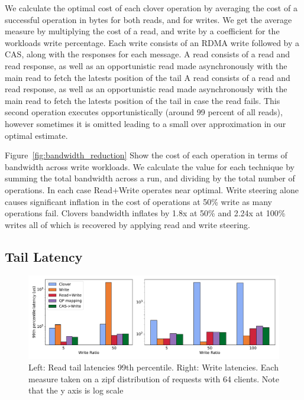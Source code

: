 We calculate the optimal cost of each clover operation by averaging the cost of
a successful operation in bytes for both reads, and for writes. We get the
average measure by multiplying the cost of a read, and write by a coefficient
for the workloads write percentage. Each write consists of an RDMA write
followed by a CAS, along with the responses for each message. A read consists of
a read and read response, as well as an opportunistic read made asynchronously
with the main read to fetch the latests position of the tail A read consists of
a read and read response, as well as an opportunistic read made asynchronously
with the main read to fetch the latests position of the tail in case the read
fails. This second operation executes opportunistically (around 99 percent of
all reads), however sometimes it is omitted leading to a small over approximation
in our optimal estimate. 

Figure~\ref{fig:bandwidth_reduction} Show the cost of each operation in terms of
bandwidth across write workloads. We calculate the value for each technique by
summing the total bandwidth across a run, and dividing by the total number of
operations. In each case Read+Write operates near optimal. Write steering alone
causes significant inflation in the cost of operations at 50\% write as many
operations fail. Clovers bandwidth inflates by 1.8x at 50\% and 2.24x at 100\%
writes all of which is recovered by applying read and write steering.

\subsection{Tail Latency}

\begin{figure}
    \includegraphics[width=1.0\textwidth]{fig/99th_latency.pdf}

    \caption{Left: Read tail latencies 99th percentile. Right: Write latencies.
    Each measure taken on a zipf distribution of requests with 64 clients. Note that the y axis is log scale}

    \label{fig:tail_latency}
\end{figure}

